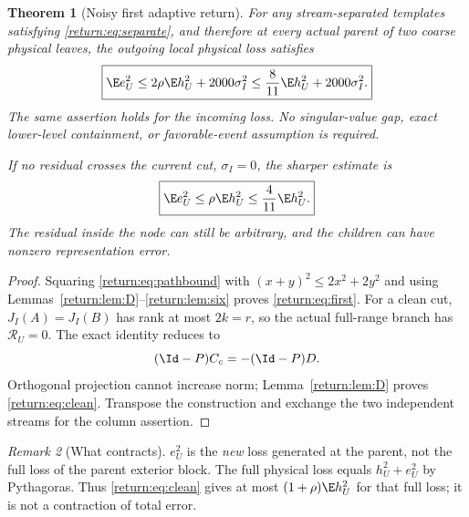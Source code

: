 \documentclass[11pt,oneside,openany,a4paper]{book}
\numberwithin{equation}{chapter}
\newtheorem{theorem}{Theorem}[chapter]
\theoremstyle{definition}
\theoremstyle{remark}
\newtheorem{remark}[theorem]{Remark}
\begin{document}
\begin{theorem}[Noisy first adaptive return]\label{return:thm:first}
For any stream-separated templates satisfying \eqref{return:eq:separate}, and therefore at every actual parent of two coarse physical leaves, the outgoing local physical loss satisfies
\begin{equation}\label{return:eq:first}
 \boxed{\E e_U^2\le2\rho\E h_U^2+2000\sigma_I^2
                 \le\frac8{11}\E h_U^2+2000\sigma_I^2.}
\end{equation}
The same assertion holds for the incoming loss. No singular-value gap, exact lower-level containment, or favorable-event assumption is required.

If no residual crosses the current cut, $\sigma_I=0$, the sharper estimate is
\begin{equation}\label{return:eq:clean}
 \boxed{\E e_U^2\le\rho\E h_U^2\le\frac4{11}\E h_U^2.}
\end{equation}
The residual inside the node can still be arbitrary, and the children can have nonzero representation error.
\end{theorem}
\begin{proof}
Squaring \eqref{return:eq:pathbound} with $(x+y)^2\le2x^2+2y^2$ and using Lemmas~\ref{return:lem:D}--\ref{return:lem:six} proves \eqref{return:eq:first}. For a clean cut, $J_I(A)=J_I(B)$ has rank at most $2k=r$, so the actual full-range branch has $\mathcal R_U=0$. The exact identity reduces to
\begin{equation}\label{return:eq:cleanidentity}
 (\Id-P)C_c=-(\Id-P)D.
\end{equation}
Orthogonal projection cannot increase norm; Lemma~\ref{return:lem:D} proves \eqref{return:eq:clean}. Transpose the construction and exchange the two independent streams for the column assertion.
\end{proof}

\begin{remark}[What contracts]
$e_U^2$ is the \emph{new} loss generated at the parent, not the full loss of the parent exterior block. The full physical loss equals $h_U^2+e_U^2$ by Pythagoras. Thus \eqref{return:eq:clean} gives at most $(1+\rho)\E h_U^2$ for that full loss; it is not a contraction of total error.
\end{remark}
\end{document}

